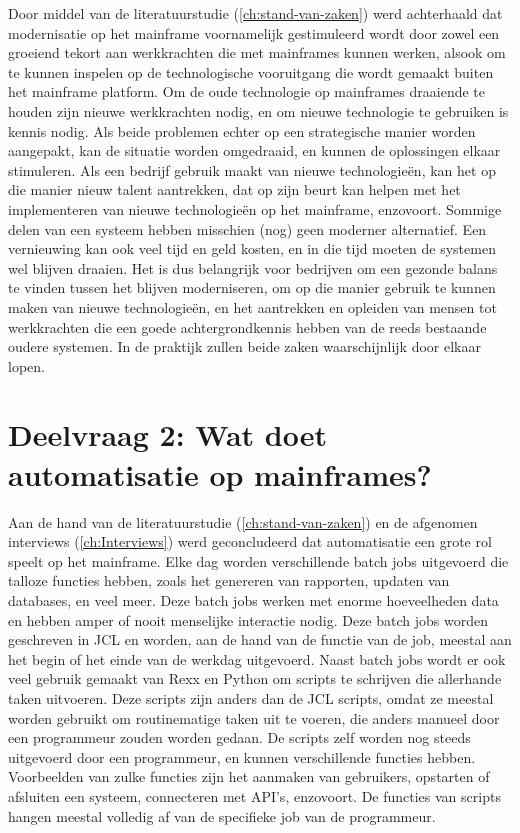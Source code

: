  Door middel van de literatuurstudie (\ref{ch:stand-van-zaken}) werd achterhaald dat modernisatie op het mainframe voornamelijk gestimuleerd wordt door zowel een groeiend tekort aan werkkrachten die met mainframes kunnen werken, alsook om te kunnen inspelen op de technologische vooruitgang die wordt gemaakt buiten het mainframe platform. Om de oude technologie op mainframes draaiende te houden zijn nieuwe werkkrachten nodig, en om nieuwe technologie te gebruiken is kennis nodig. Als beide problemen echter op een strategische manier worden aangepakt, kan de situatie worden omgedraaid, en kunnen de oplossingen elkaar stimuleren. Als een bedrijf gebruik maakt van nieuwe technologieën, kan het op die manier nieuw talent aantrekken, dat op zijn beurt kan helpen met het implementeren van nieuwe technologieën op het mainframe, enzovoort. Sommige delen van een systeem hebben misschien (nog) geen moderner alternatief. Een vernieuwing kan ook veel tijd en geld kosten, en in die tijd moeten de systemen wel blijven draaien. Het is dus belangrijk voor bedrijven om een gezonde balans te vinden tussen het blijven moderniseren, om op die manier gebruik te kunnen maken van nieuwe technologieën, en het aantrekken en opleiden van mensen tot werkkrachten die een goede achtergrondkennis hebben van de reeds bestaande oudere systemen. In de praktijk zullen beide zaken waarschijnlijk door elkaar lopen.

\section{Deelvraag 2: Wat doet automatisatie op mainframes?}


Aan de hand van de literatuurstudie (\ref{ch:stand-van-zaken}) en de afgenomen interviews (\ref{ch:Interviews}) werd geconcludeerd dat automatisatie een grote rol speelt op het mainframe. Elke dag worden verschillende batch jobs uitgevoerd die talloze functies hebben, zoals het genereren van rapporten, updaten van databases, en veel meer. Deze batch jobs werken met enorme hoeveelheden data en hebben amper of nooit menselijke interactie nodig. Deze batch jobs worden geschreven in JCL en worden, aan de hand van de functie van de job, meestal aan het begin of het einde van de werkdag uitgevoerd. Naast batch jobs wordt er ook veel gebruik gemaakt van Rexx en Python om scripts te schrijven die allerhande taken uitvoeren. Deze scripts zijn anders dan de JCL scripts, omdat ze meestal worden gebruikt om routinematige taken uit te voeren, die anders manueel door een programmeur zouden worden gedaan. De scripts zelf worden nog steeds uitgevoerd door een programmeur, en kunnen verschillende functies hebben. Voorbeelden van zulke functies zijn het aanmaken van gebruikers, opstarten of afsluiten een systeem, connecteren met API's, enzovoort. De functies van scripts hangen meestal volledig af van de specifieke job van de programmeur.

